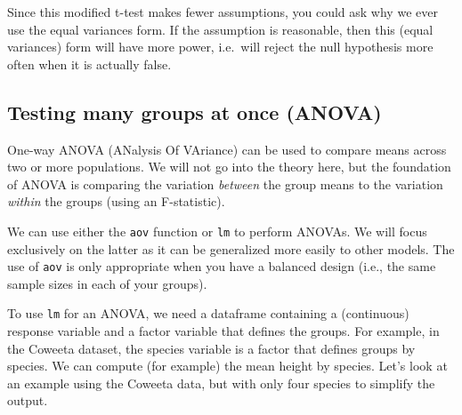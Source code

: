 \documentclass[]{book}
\newenvironment{Shaded}{\begin{snugshade}}{\end{snugshade}}
\newcommand{\CommentTok}[1]{\textcolor[rgb]{0.56,0.35,0.01}{\textit{#1}}}
\newcommand{\DataTypeTok}[1]{\textcolor[rgb]{0.13,0.29,0.53}{#1}}
\newcommand{\KeywordTok}[1]{\textcolor[rgb]{0.13,0.29,0.53}{\textbf{#1}}}
\newcommand{\NormalTok}[1]{#1}
\newcommand{\OperatorTok}[1]{\textcolor[rgb]{0.81,0.36,0.00}{\textbf{#1}}}
\newcommand{\StringTok}[1]{\textcolor[rgb]{0.31,0.60,0.02}{#1}}
\begin{document}
Since this modified t-test makes fewer assumptions, you could ask why we ever use the equal variances form. If the assumption is reasonable, then this (equal variances) form will have more power, i.e.~will reject the null hypothesis more often when it is actually false.

\hypertarget{testing-many-groups-at-once-anova}{%
\subsection{Testing many groups at once (ANOVA)}\label{testing-many-groups-at-once-anova}}

One-way ANOVA (ANalysis Of VAriance) can be used to compare means across two or more populations. We will not go into the theory here, but the foundation of ANOVA is comparing the variation \emph{between} the group means to the variation \emph{within} the groups (using an F-statistic).

We can use either the \texttt{aov} function or \texttt{lm} to perform ANOVAs. We will focus exclusively on the latter as it can be generalized more easily to other models. The use of \texttt{aov} is only appropriate when you have a balanced design (i.e., the same sample sizes in each of your groups).

To use \texttt{lm} for an ANOVA, we need a dataframe containing a (continuous) response variable and a factor variable that defines the groups. For example, in the Coweeta dataset, the species variable is a factor that defines groups by species. We can compute (for example) the mean height by species. Let's look at an example using the Coweeta data, but with only four species to simplify the output.

\begin{Shaded}
\end{Shaded}
\end{document}
